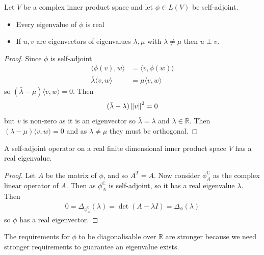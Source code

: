 \begin{lemma}
    Let $V$ be a complex inner product space and let $\phi \in L(V)$ be self-adjoint.

    \begin{itemize}
      \item Every eigenvalue of $\phi$ is real
      \item If $u, v$ are eigenvectors of eigenvalues $\lambda, \mu$ with $\lambda \not = \mu$ then $u \perp v$.
    \end{itemize}
\end{lemma}
\begin{proof}
    Since $\phi$ is self-adjoint
    \begin{align*}
      \langle \phi(v), w \rangle &= \langle v, \phi(w) \rangle \\
      \bar{\lambda} \langle v, w \rangle &= \mu \langle v, w \rangle
    \end{align*}
    so $(\bar{\lambda} - \mu) \langle v, w \rangle = 0$. Then
    \[(\bar{\lambda} - \lambda) \left\lVert v \right\rVert^2 = 0\]
    but $v$ is non-zero as it is an eigenvector so $\bar{\lambda} = \lambda$ and $\lambda \in \mathbb{R}$. Then $(\lambda - \mu) \langle v, w \rangle = 0$ and as $\lambda \not = \mu$ they must be orthogonal.
\end{proof}

\begin{prop}
    A self-adjoint operator on a real finite dimensional inner product space $V$ has a real eigenvalue.
\end{prop}
\begin{proof}
  Let $A$ be the matrix of $\phi$, and so $A^T = A$. Now consider $\phi^\mathbb{C}_A$ as the complex linear operator of $A$. Then as $\phi_A^\mathbb{C}$ is self-adjoint, so it has a real eigenvalue $\lambda$. Then
  \begin{align*}
    0 = \Delta_{\phi_A^\mathbb{C}}(\lambda) = \det(A - \lambda I) = \Delta_\phi(\lambda)
  \end{align*}
  so $\phi$ has a real eigenvector.
\end{proof}

\begin{remark}
    The requirements for $\phi$ to be diagonalisable over $\mathbb{R}$ are stronger because we need stronger requirements to guarantee an eigenvalue exists.
\end{remark}

